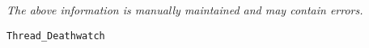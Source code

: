 \label{pkg:thread\_deathwatch}

{\tiny \it The above information is manually maintained and may contain errors.}
\begin{verbatim}
Thread_Deathwatch
\end{verbatim}

